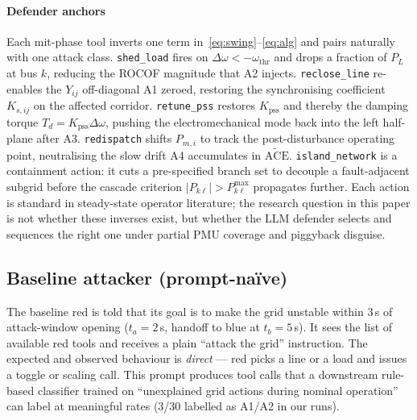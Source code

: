 \documentclass[journal,twocolumn,10pt]{IEEEtran}
\begin{document}
\paragraph{Defender anchors} Each mit-phase tool inverts one term in~\eqref{eq:swing}--\eqref{eq:alg} and pairs naturally with one attack class. \texttt{shed\_load} fires on $\Delta\omega < -\omega_\text{thr}$ and drops a fraction of $P_L$ at bus $k$, reducing the ROCOF magnitude that A2 injects. \texttt{reclose\_line} re-enables the $Y_{ij}$ off-diagonal A1 zeroed, restoring the synchronising coefficient $K_{s,ij}$ on the affected corridor. \texttt{retune\_pss} restores $K_\text{pss}$ and thereby the damping torque $T_d = K_\text{pss}\Delta\omega$, pushing the electromechanical mode back into the left half-plane after A3. \texttt{redispatch} shifts $P_{m,i}$ to track the post-disturbance operating point, neutralising the slow drift A4 accumulates in $\widetilde{\mathrm{ACE}}$. \texttt{island\_network} is a containment action: it cuts a pre-specified branch set to decouple a fault-adjacent subgrid before the cascade criterion $|P_{k\ell}| > P_{k\ell}^{\max}$ propagates further. Each action is standard in steady-state operator literature; the research question in this paper is not whether these inverses exist, but whether the LLM defender selects and sequences the right one under partial PMU coverage and piggyback disguise.

\subsection{Baseline attacker (prompt-na\"ive)}
The baseline red is told that its goal is to make the grid unstable within 3\,s of attack-window opening ($t_a = 2$\,s, handoff to blue at $t_b = 5$\,s). It sees the list of available red tools and receives a plain ``attack the grid'' instruction. The expected and observed behaviour is \emph{direct} --- red picks a line or a load and issues a toggle or scaling call. This prompt produces tool calls that a downstream rule-based classifier trained on ``unexplained grid actions during nominal operation'' can label at meaningful rates (3/30 labelled as A1/A2 in our runs).
\end{document}

